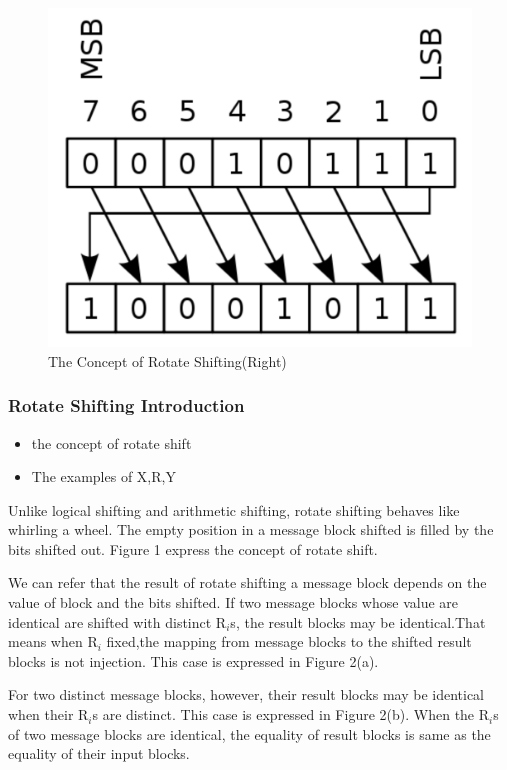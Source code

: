 \documentclass{article}
\begin{document}
\begin{figure}[htbp]
 \centering
 \includegraphics[scale=0.4]{./diagrams/rotate_right.pdf}
 \caption{The Concept of Rotate Shifting(Right)}
 \label{fig:1 }
\end{figure}

\subsubsection{Rotate Shifting Introduction} 
\begin{itemize}
	\item the concept of rotate shift
	\item The examples of X,R,Y
\end{itemize}
Unlike logical shifting and arithmetic shifting, rotate shifting
behaves like whirling a wheel. The empty position in a message block shifted is
filled by the bits shifted out. Figure 1 express the concept of rotate shift.

We can refer that the result of rotate shifting a message block depends on the
value of block and the bits shifted.  If two message blocks whose value are
identical are shifted with distinct R$_i$s, the result blocks may be
identical.That means when R$_i$ fixed,the mapping from message blocks to the
shifted result blocks is not injection. This case is expressed in Figure 2(a).

For two distinct message blocks, however, their result blocks may be identical
when their R$_i$s are distinct. This case is expressed in Figure 2(b).  
When the R$_i$s of two message blocks are identical, the equality of result blocks
is same as the equality of their input blocks.				
\end{document}
